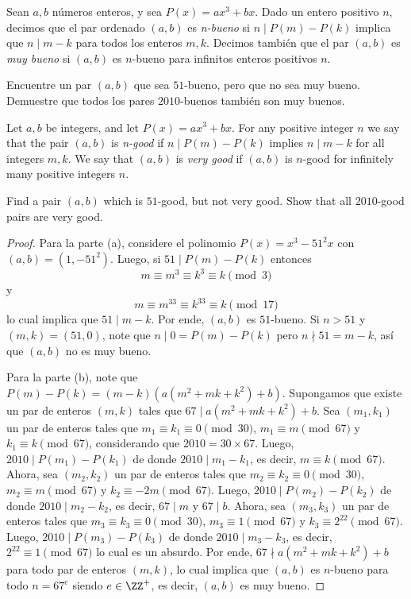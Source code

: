 \begin{probMG}
  Sean $a,b$ números enteros, y sea $P(x)=ax^3+bx$. Dado un entero positivo $n$,
  decimos que el par ordenado $(a,b)$ es \emph{n-bueno} si $n\mid P(m)-P(k)$
  implica que $n\mid m-k$ para todos los enteros $m,k$. Decimos también que el
  par $(a,b)$ es \emph{muy bueno} si $(a,b)$ es $n$-bueno para infinitos enteros
  positivos $n$.
  \begin{enumerate}[(a)]
    \ii Encuentre un par $(a,b)$ que sea $51$-bueno, pero que no sea muy bueno.
    \ii Demuestre que todos los pares $2010$-buenos también son muy buenos.
  \end{enumerate}
  \begin{hint}
    Let $a,b$ be integers, and let $P(x)=ax^3+bx$. For any positive integer $n$
    we say that the pair $(a,b)$ is \emph{n-good} if $n\mid P(m)-P(k)$ implies
    $n\mid m-k$ for all integers $m,k$. We say that $(a,b)$ is \emph{very good}
    if $(a,b)$ is $n$-good for infinitely many positive integers $n$.
    \begin{enumerate}[(a)]
      \ii Find a pair $(a,b)$ which is $51$-good, but not very good.
      \ii Show that all $2010$-good pairs are very good.
    \end{enumerate}
  \end{hint}
\end{probMG}

\begin{proof}
  Para la parte (a), considere el polinomio $P(x)=x^3-51^2x$ con
  $(a,b)=(1,-51^2)$. Luego, si $51\mid P(m)-P(k)$ entonces
  \[m\equiv m^3\equiv k^3\equiv k\pmod 3\]
  y
  \[m\equiv m^{33}\equiv k^{33}\equiv k\pmod 17\]
  lo cual implica que $51\mid m-k$. Por ende, $(a,b)$ es $51$-bueno. Si $n>51$ y
  $(m,k)=(51,0)$, note que $n\mid 0=P(m)-P(k)$ pero $n\nmid 51=m-k$, así que
  $(a,b)$ no es muy bueno.

  Para la parte (b), note que $P(m)-P(k)=(m-k)(a(m^2+mk+k^2)+b)$. Supongamos que
  existe un par de enteros $(m,k)$ tales que $67\mid a(m^2+mk+k^2)+b$. Sea
  $(m_1,k_1)$ un par de enteros tales que $m_1\equiv k_1\equiv 0\pmod 30$,
  $m_1\equiv m\pmod{67}$ y $k_1\equiv k\pmod{67}$, considerando que
  $2010=30\times 67$. Luego, $2010\mid P(m_1)-P(k_1)$ de donde
  $2010\mid m_1-k_1$, es decir, $m\equiv k\pmod{67}$. Ahora, sea $(m_2,k_2)$ un
  par de enteros tales que $m_2\equiv k_2\equiv 0\pmod 30$,
  $m_2\equiv m\pmod{67}$ y $k_2\equiv -2m\pmod{67}$. Luego,
  $2010\mid P(m_2)-P(k_2)$ de donde $2010\mid m_2-k_2$, es decir, $67\mid m$ y
  $67\mid b$. Ahora, sea $(m_3,k_3)$ un par de enteros tales que
  $m_3\equiv k_3\equiv 0\pmod 30$, $m_3\equiv 1\pmod{67}$ y
  $k_3\equiv 2^{22}\pmod{67}$. Luego, $2010\mid P(m_3)-P(k_3)$ de donde
  $2010\mid m_3-k_3$, es decir, $2^{22}\equiv 1\pmod{67}$ lo cual es un absurdo.
  Por ende, $67\nmid a(m^2+mk+k^2)+b$ para todo par de enteros $(m,k)$, lo cual
  implica que $(a,b)$ es $n$-bueno para todo $n=67^e$ siendo $e\in\ZZ^+$, es
  decir, $(a,b)$ es muy bueno.
\end{proof}

